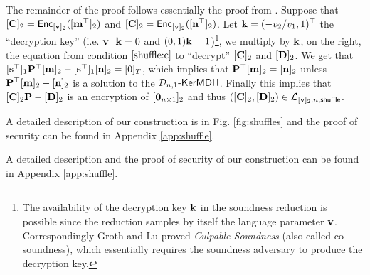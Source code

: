 The remainder of the proof follows essentially the proof from \cite{AC:GroLu07}. Suppose that $[\mathbf{{C}}]_2=\mathsf{Enc}_{[\mathbf{v}]_2}([\mathbf{{m}}^\top]_2)$ and $[\mathbf{{C}}]_2=\mathsf{Enc}_{[\mathbf{v}]_2}([\mathbf{{n}}^\top]_2)$. Let $\mathbf{k}=(-v_2/v_1,1)^\top$ the ``decryption key'' (i.e. $\mathbf{v}^\top\mathbf{k}=0$ and $(0,1)\mathbf{k}=1$)\footnote{The availability of the decryption key $\mathbf{k}$ in the soundness reduction is possible since the reduction samples by itself the language parameter $\mathbf{v}$. Correspondingly Groth and Lu \cite{AC:GroLu07} proved \emph{Culpable Soundness} (also called co-soundness), which essentially requires the soundness adversary to produce the decryption key.}, we multiply by $\mathbf{{k}}$, on the right, the equation from condition $\ref{shuffle:c}$ to ``decrypt'' $[\mathbf{{C}}]_2$ and $[\mathbf{{D}}]_2$. We get that
$[\mathbf{s}^\top]_1\mathbf{{P}}^\top[\mathbf{{m}}]_2-[\mathbf{s}^\top]_1[\mathbf{{n}}]_2=[0]_T$, which implies that $\mathbf{{P}}^\top[\mathbf{{m}}]_2=[\mathbf{{n}}]_2$ unless $\mathbf{{P}}^\top[\mathbf{{m}}]_2-[\mathbf{{n}}]_2$ is a solution to the $\mathcal{D}_{n,1}\mbox{-}\mathsf{KerMDH}$. Finally this implies that $[\mathbf{{C}}]_2\mathbf{{P}}-[\mathbf{{D}}]_2$ is an encryption of $[\mathbf{{0}}_{n\times 1}]_2$ and thus $([\mathbf{{C}}]_2,[\mathbf{{D}}]_2)\in\mathcal{L}_{[\mathbf{v}]_2,n,\mathsf{shuffle}}$.

\iffull
A detailed description of our construction is in Fig. \ref{fig:shuffles} and the proof of security can be found in Appendix \ref{app:shuffle}.

\else
A detailed description and the proof of security of our construction can be found in Appendix \ref{app:shuffle}.
\fi
